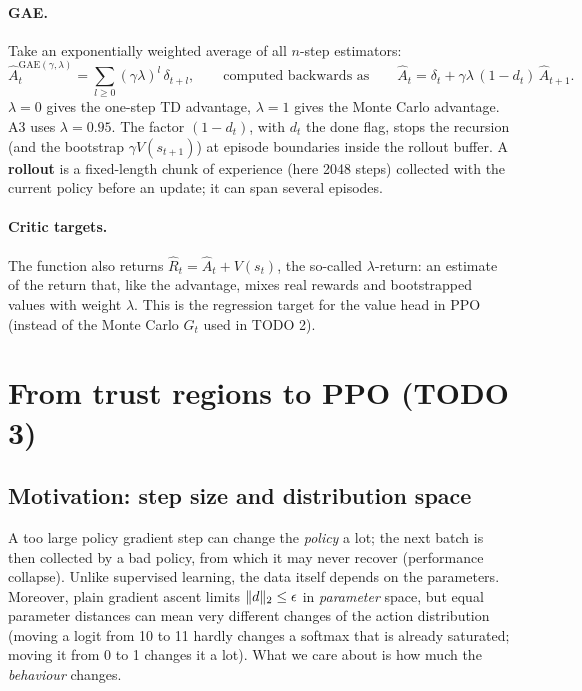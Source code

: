 \documentclass[11pt,a4paper]{article}
\DeclarePairedDelimiter{\norm}{\lVert}{\rVert}
\newcommand{\hA}{\hat{A}}
\begin{document}
\paragraph{GAE.} Take an exponentially weighted average of all $n$-step estimators:
\begin{equation}
  \hA^{\mathrm{GAE}(\gamma,\lambda)}_t = \sum_{l\ge0}(\gamma\lambda)^l\,\delta_{t+l},
  \qquad\text{computed backwards as}\qquad
  \hA_t = \delta_t + \gamma\lambda\,(1-d_t)\,\hA_{t+1}.
\end{equation}
$\lambda=0$ gives the one-step TD advantage, $\lambda=1$ gives the Monte Carlo advantage. A3 uses $\lambda=0.95$.
The factor $(1-d_t)$, with $d_t$ the done flag, stops the recursion (and the bootstrap $\gamma V(s_{t+1})$) at episode boundaries inside the rollout buffer. A \textbf{rollout} is a fixed-length chunk of experience (here 2048 steps) collected with the current policy before an update; it can span several episodes.

\paragraph{Critic targets.} The function also returns $\hat R_t = \hA_t + V(s_t)$, the so-called $\lambda$-return: an estimate of the return that, like the advantage, mixes real rewards and bootstrapped values with weight $\lambda$. This is the regression target for the value head in PPO (instead of the Monte Carlo $G_t$ used in TODO 2).

\section{From trust regions to PPO (TODO 3)}\label{sec:ppo}

\subsection{Motivation: step size and distribution space}
A too large policy gradient step can change the \emph{policy} a lot; the next batch is then collected by a bad policy, from which it may never recover (performance collapse). Unlike supervised learning, the data itself depends on the parameters.
Moreover, plain gradient ascent limits $\norm{d}_2\le\epsilon$ in \emph{parameter} space, but equal parameter distances can mean very different changes of the action distribution (moving a logit from 10 to 11 hardly changes a softmax that is already saturated; moving it from 0 to 1 changes it a lot). What we care about is how much the \emph{behaviour} changes.
\end{document}
